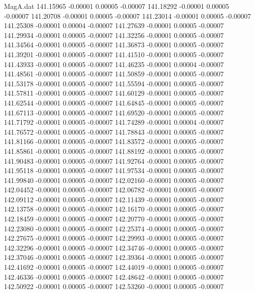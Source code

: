 \begin{filecontents}{MagA.dat}
 141.15965   -0.00001    0.00005   -0.00007
 141.18292   -0.00001    0.00005   -0.00007
 141.20708   -0.00001    0.00005   -0.00007
 141.23014   -0.00001    0.00005   -0.00007
 141.25308   -0.00001    0.00004   -0.00007
 141.27639   -0.00001    0.00005   -0.00007
 141.29934   -0.00001    0.00005   -0.00007
 141.32256   -0.00001    0.00005   -0.00007
 141.34564   -0.00001    0.00005   -0.00007
 141.36873   -0.00001    0.00005   -0.00007
 141.39201   -0.00001    0.00005   -0.00007
 141.41510   -0.00001    0.00005   -0.00007
 141.43933   -0.00001    0.00005   -0.00007
 141.46235   -0.00001    0.00004   -0.00007
 141.48561   -0.00001    0.00005   -0.00007
 141.50859   -0.00001    0.00005   -0.00007
 141.53178   -0.00001    0.00005   -0.00007
 141.55594   -0.00001    0.00005   -0.00007
 141.57811   -0.00001    0.00005   -0.00007
 141.60129   -0.00001    0.00005   -0.00007
 141.62544   -0.00001    0.00005   -0.00007
 141.64845   -0.00001    0.00005   -0.00007
 141.67113   -0.00001    0.00005   -0.00007
 141.69520   -0.00001    0.00005   -0.00007
 141.71792   -0.00001    0.00005   -0.00007
 141.74289   -0.00001    0.00004   -0.00007
 141.76572   -0.00001    0.00005   -0.00007
 141.78843   -0.00001    0.00005   -0.00007
 141.81166   -0.00001    0.00005   -0.00007
 141.83572   -0.00001    0.00005   -0.00007
 141.85861   -0.00001    0.00005   -0.00007
 141.88192   -0.00001    0.00005   -0.00007
 141.90483   -0.00001    0.00005   -0.00007
 141.92764   -0.00001    0.00005   -0.00007
 141.95118   -0.00001    0.00005   -0.00007
 141.97534   -0.00001    0.00005   -0.00007
 141.99840   -0.00001    0.00005   -0.00007
 142.02160   -0.00001    0.00005   -0.00007
 142.04452   -0.00001    0.00005   -0.00007
 142.06782   -0.00001    0.00005   -0.00007
 142.09112   -0.00001    0.00005   -0.00007
 142.11439   -0.00001    0.00005   -0.00007
 142.13758   -0.00001    0.00005   -0.00007
 142.16170   -0.00001    0.00005   -0.00007
 142.18459   -0.00001    0.00005   -0.00007
 142.20770   -0.00001    0.00005   -0.00007
 142.23080   -0.00001    0.00005   -0.00007
 142.25374   -0.00001    0.00005   -0.00007
 142.27675   -0.00001    0.00005   -0.00007
 142.29993   -0.00001    0.00005   -0.00007
 142.32296   -0.00001    0.00005   -0.00007
 142.34746   -0.00001    0.00005   -0.00007
 142.37046   -0.00001    0.00005   -0.00007
 142.39364   -0.00001    0.00005   -0.00007
 142.41692   -0.00001    0.00005   -0.00007
 142.44019   -0.00001    0.00005   -0.00007
 142.46336   -0.00001    0.00005   -0.00007
 142.48642   -0.00001    0.00005   -0.00007
 142.50922   -0.00001    0.00005   -0.00007
 142.53260   -0.00001    0.00005   -0.00007

\end{filecontents}

